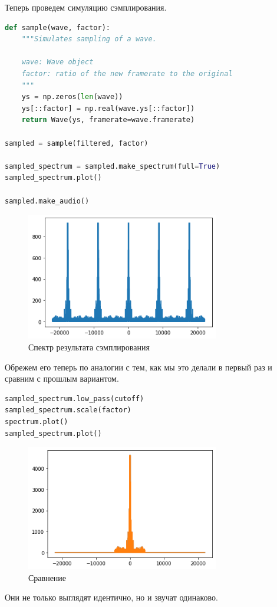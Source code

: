 \documentclass[a4paper,12pt]{report}
\begin{document}
    Теперь проведем симуляцию сэмплирования.
    
\begin{lstlisting}[language=Python,caption=Сэмплирование]
def sample(wave, factor):
    """Simulates sampling of a wave.
    
    wave: Wave object
    factor: ratio of the new framerate to the original
    """
    ys = np.zeros(len(wave))
    ys[::factor] = np.real(wave.ys[::factor])
    return Wave(ys, framerate=wave.framerate) 

sampled = sample(filtered, factor)

sampled_spectrum = sampled.make_spectrum(full=True)
sampled_spectrum.plot()

sampled.make_audio()
\end{lstlisting}

    \begin{figure}[H]
        \centering
        \includegraphics[width=0.75\textwidth]{images/ex2_sampled.png}
        \caption{Спектр результата сэмплирования}
        \label{fig:ex2_sampled}
    \end{figure}

    Обрежем его теперь по аналогии с тем, как мы это делали в первый раз и сравним с прошлым вариантом.
    
\begin{lstlisting}[language=Python,caption=Подчищаем спектр]
sampled_spectrum.low_pass(cutoff)
sampled_spectrum.scale(factor)
spectrum.plot()
sampled_spectrum.plot()
\end{lstlisting}

    \begin{figure}[H]
        \centering
        \includegraphics[width=0.75\textwidth]{images/ex2_fixed.png}
        \caption{Сравнение}
        \label{fig:ex2_fixed}
    \end{figure}

    Они не только выглядят идентично, но и звучат одинаково.

    
\end{document}
